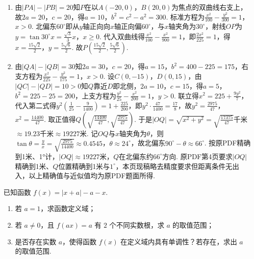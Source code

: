\begin{solution}
\begin{enumerate}\item 由\(|PA|-|PB|=20\)知\(P\)在以\(A(-20,0)\)，\(B(20,0)\)为焦点的双曲线右支上，故\(2a=20\)，\(c=20\)，得\(a=10\)，\(b^{2}=c^{2}-a^{2}=300\). 标准方程为\(\frac{x^{2}}{100}-\frac{y^{2}}{300}=1\)，\(x>0\). 北偏东\(60^{\circ}\)即从\(y\)轴正向向\(x\)轴正向偏\(60^{\circ}\)，与\(x\)轴夹角为\(30^{\circ}\)，射线\(OP\)为\(y=\tan 30^{\circ}x=\frac{\sqrt{3}}{3}x\)，\(x\ge 0\). 代入双曲线得\(\frac{x^{2}}{100}-\frac{x^{2}}{900}=1\)，即\(\frac{2x^{2}}{225}=1\)，得\(x=\frac{15\sqrt{2}}{2}\)，\(y=\frac{5\sqrt{6}}{2}\). 故\(P\left(\frac{15\sqrt{2}}{2},\frac{5\sqrt{6}}{2}\right)\). \item 由\(|QA|-|QB|=30\)知\(2a=30\)，\(c=20\)，得\(a=15\)，\(b^{2}=400-225=175\)，右支方程为\(\frac{x^{2}}{225}-\frac{y^{2}}{175}=1\)，\(x>0\). 设\(C(0,-15)\)，\(D(0,15)\)，由\(|QC|-|QD|=10>0\)知\(Q\)靠近\(D\)即北侧，\(2a=10\)，\(c=15\)，得\(a=5\)，\(b^{2}=225-25=200\)，上支方程为\(\frac{y^{2}}{25}-\frac{x^{2}}{200}=1\)，\(y>0\). 联立得\(x^{2}=225+\frac{9y^{2}}{7}\)，代入第二式得\(y^{2}\left(\frac{1}{25}-\frac{9}{1400}\right)=1+\frac{225}{200}\)，即\(y^{2}\cdot\frac{47}{1400}=\frac{17}{8}\)，故\(y^{2}=\frac{2975}{47}\)，\(x^{2}=\frac{14400}{47}\). 取正值得\(Q\left(\sqrt{\frac{14400}{47}},\sqrt{\frac{2975}{47}}\right)\). 于是\(|OQ|=\sqrt{x^{2}+y^{2}}=\sqrt{\frac{17375}{47}}\)千米\(\approx 19.23\)千米\(\approx 19227\)米. 记\(OQ\)与\(x\)轴夹角为\(\theta\)，则\(\tan\theta=\frac{y}{x}=\sqrt{\frac{2975}{14400}}\approx 0.4545\)，\(\theta\approx 24^{\circ}\)，故北偏东\(90^{\circ}-\theta\approx 66^{\circ}\). 按原PDF精确到1米、1°计，\(|OQ|\approx 19227\)米，\(Q\)在北偏东约\(66^{\circ}\)方向. 原PDF第4页要求\(|OQ|\)精确到1米、\(Q\)位置精确到1米与\(1^{\circ}\)，本页现稿略去精度要求但距离条件无出入，以上精确值与近似值均为原PDF题面所得. \end{enumerate}
\end{solution}

\begin{problem}
已知函数 \(f(x)=|x+a|-a-x\).
\begin{enumerate}
\item 若 \(a=1\)，求函数定义域；
\item 若 \(a\ne0\)，且 \(f(ax)=a\) 有 \(2\) 个不同实数根，求 \(a\) 的取值范围；
\item 是否存在实数 \(a\)，使得函数 \(f(x)\) 在定义域内具有单调性？若存在，求出 \(a\) 的取值范围.
\end{enumerate}
\end{problem}

